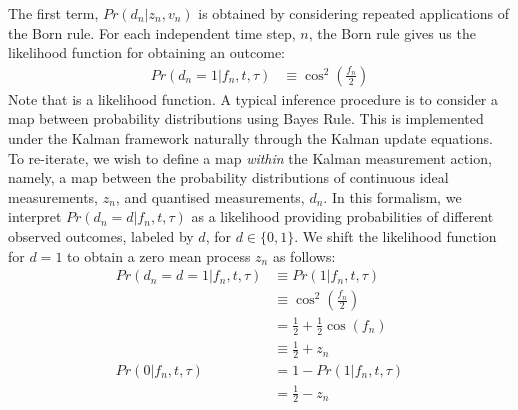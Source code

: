 The first term, $Pr(d_n | z_n, v_n)$ is obtained by considering repeated applications of the Born rule. For each independent time step, $n$, the Born rule gives us the likelihood function for obtaining an outcome:
\begin{align}
Pr(d_n=1 | f_n, t, \tau) & \equiv \cos^2(\frac{f_n}{2}) 
\end{align}
Note that is a likelihood function. A typical inference procedure is to consider a map between probability distributions using Bayes Rule. This is implemented under the Kalman framework naturally through the Kalman update equations. To re-iterate, we wish to define a map \emph{within} the Kalman measurement action, namely, a map between the probability distributions of continuous ideal measurements, $z_n$, and quantised measurements, $d_n$. In this formalism, we interpret $Pr(d_n=d | f_n, t, \tau)$ as a likelihood providing probabilities of different observed outcomes, labeled by $d$, for $d \in \{0, 1\}$. We shift the likelihood function for $d=1$ to obtain a zero mean process $z_n$ as follows: 
\begin{align} 
Pr(d_n=d=1 | f_n, t, \tau) &\equiv Pr(1 | f_n, t, \tau)\\
 & \equiv \cos^2(\frac{f_n}{2}) \\
& = \frac{1}{2} +  \frac{1}{2}\cos(f_n) \\
& \equiv \frac{1}{2} +  z_n  \\
Pr(0 | f_n, t, \tau) & = 1 - Pr(1 | f_n, t, \tau)\\
& = \frac{1}{2} - z_n \label{eqn:app:bornrule:up}
\end{align}

